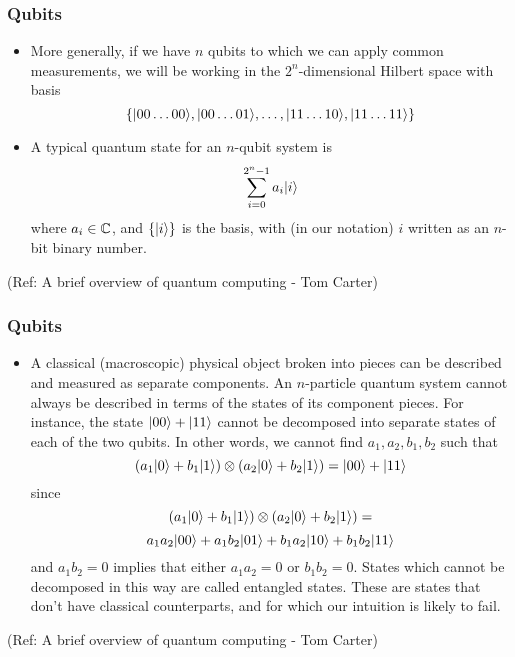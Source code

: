  \begin{frame}[fragile]\frametitle{Qubits}

\begin{itemize}

	\item More generally, if we have $n$ qubits to which we can apply common measurements, we will be working in the $2^n$-dimensional Hilbert space with basis
$$\{|{00\ldots00}\rangle,|{00\ldots01}\rangle,\ldots,|{11\ldots10}\rangle,|{11\ldots11}\rangle\}$$
\item A typical quantum state for an $n$-qubit system is
$$\sum_{i = 0}^{2^n-1}a_i|{i}\rangle$$
where $a_i\in\mathbb{C}$, and $\{|{i}\rangle\}$ is the basis, with (in our notation) $i$ written as an $n$-bit binary number.

\end{itemize}

\tiny{(Ref: A brief overview of quantum computing - Tom Carter)}

\end{frame}

 \begin{frame}[fragile]\frametitle{Qubits}

\begin{itemize}
\item A classical (macroscopic) physical 
object broken into pieces can be described and measured as separate components.
An $n$-particle quantum system cannot always be
described in terms of the states of its component pieces. For instance, 
the state \newline$|{00}\rangle+|{11}\rangle$ cannot be decomposed into separate states
of each of the two qubits.  In other words, we cannot find 
$a_1,a_2,b_1,b_2$ such that 
$$(a_1|{0}\rangle + b_1|{1}\rangle)\otimes (a_2|{0}\rangle + b_2|{1}\rangle) = |{00}\rangle+|{11}\rangle$$
since 
$$(a_1|{0}\rangle + b_1|{1}\rangle)\otimes (a_2|{0}\rangle + b_2|{1}\rangle) = $$
$$  a_1a_2|{00}\rangle + a_1b_2|{01}\rangle + b_1a_2|{10}\rangle + b_1b_2|{11}\rangle$$ and
$a_1b_2 = 0$ implies that either $a_1a_2 = 0$ or $b_1b_2 = 0$.
States which cannot be decomposed in this way are called entangled states.
These are states that don't have classical counterparts, and
for which our intuition is likely to fail.

\end{itemize}

\tiny{(Ref: A brief overview of quantum computing - Tom Carter)}

\end{frame}

